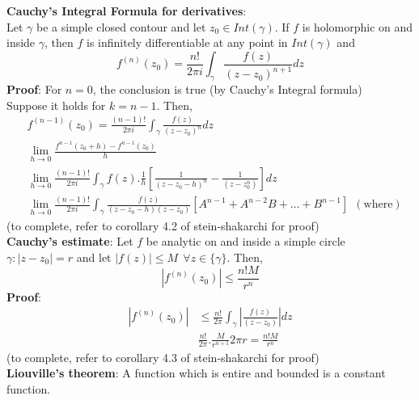 \documentclass{article}
\begin{document}
\begin{flushleft}
\textbf{Cauchy's Integral Formula for derivatives}: \\
Let $\gamma$ be a simple closed contour and let $z_0\in Int(\gamma)$. If $f$ is holomorphic on and inside $\gamma$, then $f$ is infinitely differentiable at any point in $Int(\gamma)$ and\\
\begin{equation*}
    f^{(n)}(z_0)=\frac{n!}{2\pi i}\int_{\gamma}^{}\frac{f(z)}{(z-z_0)^{n+1}} dz
\end{equation*}
\textbf{Proof}: For $n=0$, the conclusion is true (by Cauchy's Integral formula)\\
Suppose it holds for $k=n-1$. Then,\\
\begin{equation*}
    \begin{split}
    &f^{(n-1)}(z_0)=\frac{(n-1)!}{2\pi i}\int_{\gamma}^{}\frac{f(z)}{(z-z_0)^n} dz\\
    &\lim_{h \to 0} \frac{f^{n-1}(z_0+h)-f^{n-1}(z_0)}{h}\\
    &\lim_{h \to 0} \frac{(n-1)!}{2\pi i}\int_{\gamma}^{} f(z).\frac{1}{h}[\frac{1}{(z-z_0-h)^n}-\frac{1}{(z-z_0^n)}] dz\\
    &\lim_{h \to 0} \frac{(n-1)!}{2\pi i}\int_{\gamma}^{} \frac{f(z)}{(z-z_0-h)(z-z_0)}[A^{n-1}+A^{n-2}B+\dots +B^{n-1}] \:\:(\text{where})
    \end{split}
\end{equation*}
(to complete, refer to corollary 4.2 of stein-shakarchi for proof)\\
\textbf{Cauchy's estimate}: Let $f$ be analytic on and inside a simple circle $\gamma: |z-z_0|=r$ and let $|f(z)|\leq M \:\:\forall z\in \{\gamma\}$. Then,\\
\begin{equation*}
    |f^{(n)}(z_0)|\leq \frac{n!M}{r^n}
\end{equation*}
\textbf{Proof}: \begin{equation*}
    \begin{split}
        |f^{(n)}(z_0)|&\leq \frac{n!}{2\pi}\int_{\gamma}^{} |\frac{f(z)}{(z-z_0)}| dz \\
        & \frac{n!}{2\pi}.\frac{M}{r^{n+1}}2\pi r=\frac{n!M}{r^n}
    \end{split}
\end{equation*}
(to complete, refer to corollary 4.3 of stein-shakarchi for proof)\\
\textbf{Liouville's theorem}: A function which is entire and bounded is a constant function.\\

\end{flushleft}
\end{document}
